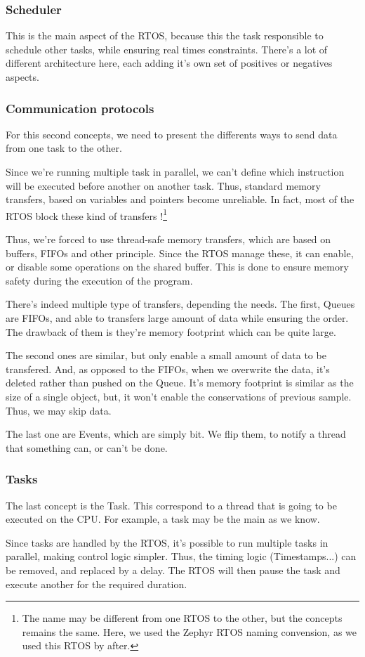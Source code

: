 \subsubsection{Scheduler}
This is the main aspect of the RTOS, because this the task responsible to
schedule other tasks, while ensuring real times constraints. There's a lot of
different architecture here, each adding it's own set of positives or negatives
aspects.

\subsubsection{Communication protocols}
For this second concepts, we need to present the differents ways to send data
from one task to the other.

Since we're running multiple task in parallel, we can't define which
instruction will be executed before another on another task. Thus, standard
memory transfers, based on variables and pointers become unreliable. In fact,
most of the RTOS block these kind of transfers !\footnote{ The name may be
    different from one RTOS to the other, but the concepts remains the same. Here,
    we used the Zephyr RTOS naming convension, as we used this RTOS by after. }

Thus, we're forced to use thread-safe memory transfers, which are based on
buffers, FIFOs and other principle. Since the RTOS manage these, it can enable,
or disable some operations on the shared buffer. This is done to ensure memory
safety during the execution of the program.

There's indeed multiple type of transfers, depending the needs. The first,
Queues are FIFOs, and able to transfers large amount of data while ensuring the
order. The drawback of them is they're memory footprint which can be quite
large.

The second ones are similar, but only enable a small amount of data to be
transfered. And, as opposed to the FIFOs, when we overwrite the data, it's
deleted rather than pushed on the Queue. It's memory footprint is similar as
the size of a single object, but, it won't enable the conservations of previous
sample. Thus, we may skip data.

The last one are Events, which are simply bit. We flip them, to notify a thread
that something can, or can't be done.

\subsubsection{Tasks}
The last concept is the Task. This correspond to a thread that is going to be
executed on the CPU. For example, a task may be the main as we know.

Since tasks are handled by the RTOS, it's possible to run multiple tasks in
parallel, making control logic simpler. Thus, the timing logic (Timestamps...)
can be removed, and replaced by a delay. The RTOS will then pause the task and
execute another for the required duration.